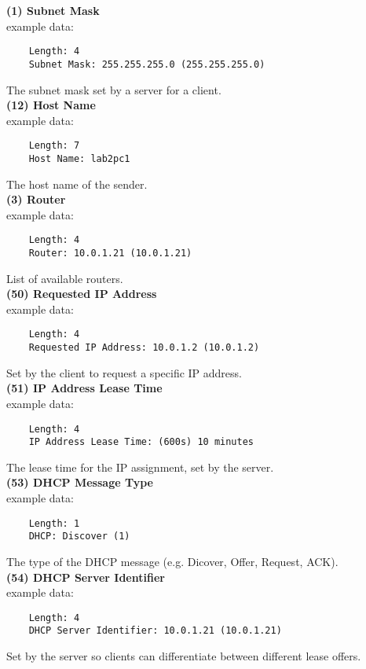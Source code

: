 \textbf{(1) Subnet Mask} \\
    example data:
    \begin{lstlisting}
    Length: 4
    Subnet Mask: 255.255.255.0 (255.255.255.0)
    \end{lstlisting}
    The subnet mask set by a server for a client.\\
 
 \textbf{(12) Host Name} \\
    example data:
    \begin{lstlisting}
    Length: 7
    Host Name: lab2pc1
    \end{lstlisting}
    The host name of the sender.\\
   
\textbf{(3) Router} \\
    example data:
    \begin{lstlisting}
    Length: 4
    Router: 10.0.1.21 (10.0.1.21) 
    \end{lstlisting}
    List of available routers.\\
    
\textbf{(50) Requested IP Address} \\
    example data:
    \begin{lstlisting}
    Length: 4
    Requested IP Address: 10.0.1.2 (10.0.1.2)
    \end{lstlisting}
    Set by the client to request a specific IP address.\\
    
     
\textbf{(51) IP Address Lease Time} \\
    example data:
    \begin{lstlisting}
    Length: 4
    IP Address Lease Time: (600s) 10 minutes
    \end{lstlisting}
    The lease time for the IP assignment, set by the server.\\
    
\textbf{(53) DHCP Message Type} \\
    example data:
    \begin{lstlisting}
    Length: 1
    DHCP: Discover (1)
    \end{lstlisting}
    The type of the DHCP message (e.g. Dicover, Offer, Request, ACK).\\
    
\textbf{(54) DHCP Server Identifier} \\
    example data:
    \begin{lstlisting}
    Length: 4
    DHCP Server Identifier: 10.0.1.21 (10.0.1.21)
    \end{lstlisting}
    Set by the server so clients can differentiate between different lease offers.\\
    
